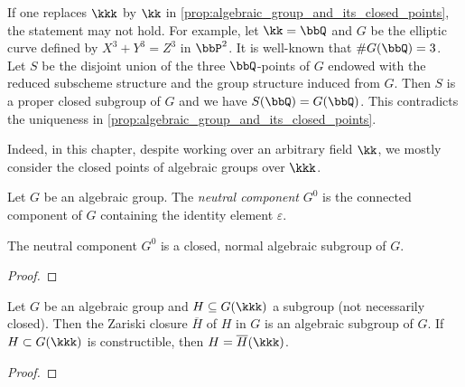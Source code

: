 
    \begin{remark}\label{rmk:closed_pointsd_and_k_points_of_algebraic_group}
        If one replaces \(\kkk\) by \(\kk\) in \cref{prop:algebraic_group_and_its_closed_points}, the statement may not hold.
        For example, let \(\kk = \bbQ\) and \(G\) be the elliptic curve defined by \(X^3 + Y^3 = Z^3\) in \(\bbP^2\).
        It is well-known that \(\# G(\bbQ) = 3\).
        Let \(S\) be the disjoint union of the three \(\bbQ\)-points of \(G\) endowed with the reduced subscheme structure and the group structure induced from \(G\).
        Then \(S\) is a proper closed subgroup of \(G\) and we have \(S(\bbQ) = G(\bbQ)\).
        This contradicts the uniqueness in \cref{prop:algebraic_group_and_its_closed_points}.

        Indeed, in this chapter, despite working over an arbitrary field \(\kk\), we mostly consider the closed points of algebraic groups over \(\kkk\).
    \end{remark}

    \begin{definition}\label{def:neutral_component}
        Let \(G\) be an algebraic group.
        The \emph{neutral component} \(G^0\) is the connected component of \(G\) containing the identity element \(\varepsilon\).
    \end{definition}

    \begin{proposition}\label{prop:neutral_component_is_subgroup}
        The neutral component \(G^0\) is a closed, normal algebraic subgroup of \(G\).
    \end{proposition}
    \begin{proof}
    \end{proof}

    \begin{proposition}\label{prop:closure_of_subgroup_is_subgroup}
        Let \(G\) be an algebraic group and \(H \subseteq G(\kkk)\) a subgroup (not necessarily closed).
        Then the Zariski closure \(\overline{H}\) of \(H\) in \(G\) is an algebraic subgroup of \(G\).
        If \(H \subset G(\kkk)\) is constructible, then \(H = \overline{H}(\kkk)\).
    \end{proposition}
    \begin{proof}
    \end{proof}

